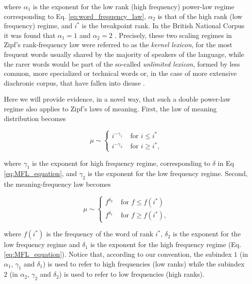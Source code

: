 \documentclass[10pt,letterpaper]{article}
\begin{document}
where $\alpha_1$ is the exponent for the low rank (high frequency) power-law regime corresponding to Eq. \ref{eq:word_frequency_law}, $\alpha_2$ is that of the high rank (low frequency) regime, and $i^*$ is the breakpoint rank. In the British National Corpus it was found that $\alpha_1 = 1$ and $\alpha_2 = 2$ \cite{ferrer2001two}. Precisely, these two scaling regimes in Zipf's rank-frequency law were referred to as the \textit{kernel lexicon}, for the most frequent words usually shared by the majority of speakers of the language, while the rarer words would be part of the so-called \textit{unlimited lexicon}, formed by less common, more specialized or technical words or, in the case of more extensive diachronic corpus, that have fallen into disuse \cite{ferrer2001two,petersen2012languages}.

Here we will provide evidence, in a novel way, that such a double power-law regime also applies to Zipf's laws of meaning.
First, the law of meaning distribution becomes

\begin{equation}
\mu \sim \left\{ 
     \begin{array}{lll}
     i^{-\gamma_1} & \mbox{~for~} i \leq i^* \\
     i^{-\gamma_2} & \mbox{~for~} i \geq i^*,
     \end{array} 
    \right.   
\label{eq:law_of_meaning_distribution_equation_2_regimes}
\end{equation}

where $\gamma_1$ is the exponent for high frequency regime, corresponding to $\delta$ in Eq \ref{eq:MFL_equation}, and $\gamma_2$ is the exponent for the low frequency regime. 
Second, the meaning-frequency law becomes

\begin{equation}
\mu \sim \left\{ 
     \begin{array}{lll}
     f^{\delta_2} & \mbox{~for~} f \leq f(i^*) \\
     f^{\delta_1} & \mbox{~for~} f \geq f(i^*),
     \end{array} 
    \right.   
\label{eq:MFL_equation_2_regimes}
\end{equation}

where $f(i^*)$ is the frequency of the word of rank $i^*$, $\delta_2$ is the exponent for the low frequency regime and $\delta_1$ is the exponent for the high frequency regime (Eq. \ref{eq:MFL_equation}).
Notice that, according to our convention, 
the subindex $1$ (in $\alpha_1$, $\gamma_1$ and $\delta_1$) is used to refer to high frequencies (low ranks) while
the subindex $2$  (in $\alpha_2$, $\gamma_2$ and $\delta_2$) is used to refer to low frequencies (high ranks). 
\end{document}
